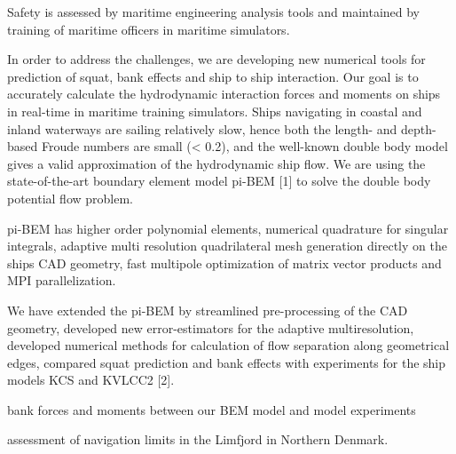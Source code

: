 \documentclass[A4paper,11pt]{marine_2023_Paper}
\begin{document}
Safety is assessed by maritime engineering analysis tools and maintained by training of maritime officers in maritime simulators.

In order to address the challenges, we are developing new numerical tools for prediction of squat, bank effects and ship to ship interaction. Our goal is to accurately calculate the hydrodynamic interaction forces and moments on ships in real-time in maritime training simulators. Ships navigating in coastal and inland waterways are sailing relatively slow, hence both the length- and depth-based Froude numbers are small (< 0.2), and the well-known double body model gives a valid approximation of the hydrodynamic ship flow. We are using the state-of-the-art boundary element model pi-BEM [1] to solve the double body potential flow problem. 

pi-BEM has higher order polynomial elements, numerical quadrature for singular integrals, adaptive multi resolution quadrilateral mesh generation directly on the ships CAD geometry, fast multipole optimization of matrix vector products and MPI parallelization. 

We have extended the pi-BEM by streamlined pre-processing of the CAD geometry, developed new error-estimators for the adaptive multiresolution, developed numerical methods for calculation of flow separation along geometrical edges, compared squat prediction and bank effects with experiments for the ship models KCS and KVLCC2 [2].



bank forces and moments between our BEM model and model experiments 

assessment of navigation limits in the Limfjord in Northern Denmark.
\end{document}
